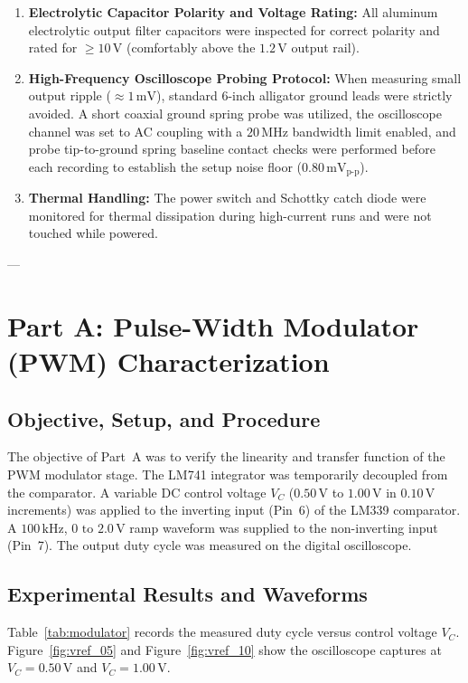 \documentclass[11pt,a4paper]{article}
\begin{document}
\begin{enumerate}
    \item \textbf{Electrolytic Capacitor Polarity and Voltage Rating:} All aluminum electrolytic output filter capacitors were inspected for correct polarity and rated for $\ge 10\,\mathrm{V}$ (comfortably above the $1.2\,\mathrm{V}$ output rail).
    \item \textbf{High-Frequency Oscilloscope Probing Protocol:} When measuring small output ripple ($\approx 1\,\mathrm{mV}$), standard 6-inch alligator ground leads were strictly avoided. A short coaxial ground spring probe was utilized, the oscilloscope channel was set to AC coupling with a $20\,\mathrm{MHz}$ bandwidth limit enabled, and probe tip-to-ground spring baseline contact checks were performed before each recording to establish the setup noise floor ($0.80\,\mathrm{mV}_{\mathrm{p\text{-}p}}$).
    \item \textbf{Thermal Handling:} The power switch and Schottky catch diode were monitored for thermal dissipation during high-current runs and were not touched while powered.
\end{enumerate}

---

\section{Part A: Pulse-Width Modulator (PWM) Characterization}

\subsection{Objective, Setup, and Procedure}
The objective of Part~A was to verify the linearity and transfer function of the PWM modulator stage. The LM741 integrator was temporarily decoupled from the comparator. A variable DC control voltage $V_C$ ($0.50\,\mathrm{V}$ to $1.00\,\mathrm{V}$ in $0.10\,\mathrm{V}$ increments) was applied to the inverting input (Pin~6) of the LM339 comparator. A $100\,\mathrm{kHz}$, $0\text{ to }2.0\,\mathrm{V}$ ramp waveform was supplied to the non-inverting input (Pin~7). The output duty cycle was measured on the digital oscilloscope.

\subsection{Experimental Results and Waveforms}
Table~\ref{tab:modulator} records the measured duty cycle versus control voltage $V_C$. Figure~\ref{fig:vref_05} and Figure~\ref{fig:vref_10} show the oscilloscope captures at $V_C = 0.50\,\mathrm{V}$ and $V_C = 1.00\,\mathrm{V}$.
\end{document}

